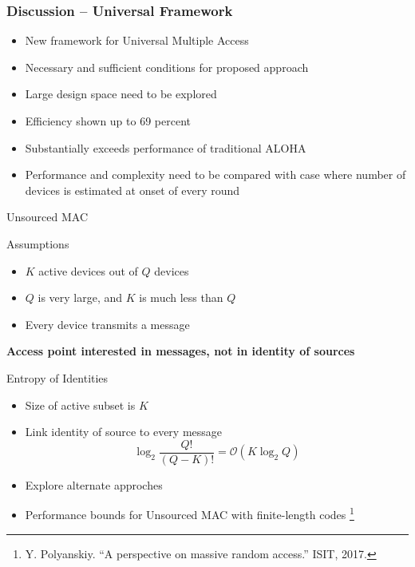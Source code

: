\documentclass[10pt]{beamer}
\begin{document}
\begin{frame}
\frametitle{Discussion -- Universal Framework}
\begin{itemize}
\item New framework for Universal Multiple Access
\item Necessary and sufficient conditions for proposed approach
\item Large design space need to be explored
\item Efficiency shown up to 69 percent
\item Substantially exceeds performance of traditional ALOHA
\item Performance and complexity need to be compared with case where number of devices is estimated at onset of every round
\end{itemize}
\end{frame}


\begin{frame}{Unsourced MAC}
\begin{block}{Assumptions}
\begin{itemize}
\item $K$ active devices out of $Q$ devices
\item $Q$ is very large, and $K$ is much less than $Q$
\item Every device transmits a message
\end{itemize}
\end{block}
\centerline{\textbf{Access point interested in messages, not in identity of sources}}
\begin{block}{Entropy of Identities}
\begin{itemize}
\item Size of active subset is $K$
\item Link identity of source to every message
\begin{equation*}
\log_2 \frac{Q!}{(Q-K)!}
= \mathcal{O} \left( K \log_2 Q \right)
\end{equation*}
\item Explore alternate approches
\item Performance bounds for Unsourced MAC with finite-length codes
\footnote[1]{
Y. Polyanskiy. ``A perspective on massive random access.'' ISIT, 2017.}
\end{itemize}
\end{block}
\end{frame}
\end{document}
